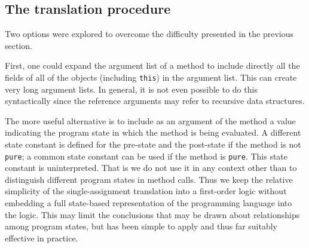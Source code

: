 \documentclass{sig-alternate}
\begin{document}
\subsection{The translation procedure}

Two options were explored to overcome the difficulty presented in the previous section.

First, one could expand the argument list of a method to include directly all the fields of all
of the objects (including \texttt{this}) in the argument list.  This can create very long
argument lists.  In general, it is not even possible to do this syntactically since the reference
arguments may refer to recursive data structures.

The more useful alternative is to include as an argument of the method a value indicating the
program state in which the method is being evaluated.  A different state constant is defined
for the pre-state and the post-state if the method is not \texttt{pure}; a common state
constant can be used if the method is \texttt{pure}.  This state constant is uninterpreted.
That is we do not use it in any context other than to distinguish different program states 
in method calls.
Thus we keep the relative simplicity of the single-assignment translation into a first-order
logic without embedding a full state-based representation of the programming language into the 
logic.
This may limit the conclusions that may be drawn about relationships among 
program states, but has
been simple to apply and thus far suitably effective in practice.
\end{document}
